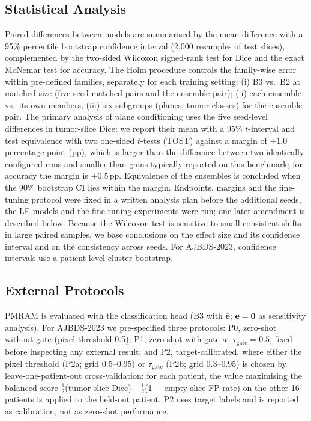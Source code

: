 \documentclass[journal]{IEEEtran}
\begin{document}
\subsection{Statistical Analysis}
Paired differences between models are summarised by the mean difference with a 95\% percentile bootstrap confidence interval (2{,}000 resamples of test slices), complemented by the two-sided Wilcoxon signed-rank test for Dice and the exact McNemar test for accuracy. The Holm procedure \cite{holm1979simple} controls the family-wise error within pre-defined families, separately for each training setting: (i) B3 vs.\ B2 at matched size (five seed-matched pairs and the ensemble pair); (ii) each ensemble vs.\ its own members; (iii) six subgroups (planes, tumor classes) for the ensemble pair. The primary analysis of plane conditioning uses the five seed-level differences in tumor-slice Dice: we report their mean with a 95\% $t$-interval and test equivalence with two one-sided $t$-tests (TOST) against a margin of $\pm1.0$ percentage point (pp), which is larger than the difference between two identically configured runs and smaller than gains typically reported on this benchmark; for accuracy the margin is $\pm0.5$\,pp. Equivalence of the ensembles is concluded when the 90\% bootstrap CI lies within the margin. Endpoints, margins and the fine-tuning protocol were fixed in a written analysis plan before the additional seeds, the LF models and the fine-tuning experiments were run; one later amendment is described below. Because the Wilcoxon test is sensitive to small consistent shifts in large paired samples, we base conclusions on the effect size and its confidence interval and on the consistency across seeds. For AJBDS-2023, confidence intervals use a patient-level cluster bootstrap.

\subsection{External Protocols}
PMRAM is evaluated with the classification head (B3 with $\bar{\mathbf{e}}$; $\mathbf{e}=\mathbf{0}$ as sensitivity analysis). For AJBDS-2023 we pre-specified three protocols: P0, zero-shot without gate (pixel threshold 0.5); P1, zero-shot with gate at $\tau_{\text{gate}}=0.5$, fixed before inspecting any external result; and P2, target-calibrated, where either the pixel threshold (P2a; grid 0.5--0.95) or $\tau_{\text{gate}}$ (P2b; grid 0.3--0.95) is chosen by leave-one-patient-out cross-validation: for each patient, the value maximising the balanced score $\tfrac12$(tumor-slice Dice) $+\tfrac12$(1 $-$ empty-slice FP rate) on the other 16 patients is applied to the held-out patient. P2 uses target labels and is reported as calibration, not as zero-shot performance.
\end{document}
